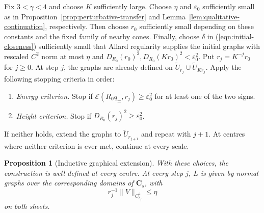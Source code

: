 \documentclass[11pt,a4paper]{article}
\numberwithin{equation}{section}
\newtheorem{proposition}[theorem]{Proposition}
\theoremstyle{definition}
\theoremstyle{remark}
\begin{document}
	Fix $3<\gamma<4$ and choose $K$ sufficiently large.
	Choose $\eta$ and $\varepsilon_0$ sufficiently small as in
	Proposition~\ref{prop:perturbative-transfer} and
	Lemma~\ref{lem:qualitative-continuation}, respectively.
	Then choose $r_0$ sufficiently small depending on these constants
	and the fixed family of nearby cones.
	Finally, choose $\delta$ in (\ref{eqn:initial-closeness}) sufficiently
	small that Allard regularity supplies the initial graphs with
	rescaled $C^2$ norm at most $\eta$ and
	$D_{R_0}(r_0)^2,D_{R_0}(Kr_0)^2<\varepsilon_0^2$.
	Put $r_j=K^{-j}r_0$ for $j\ge0$. At step $j$, the graphs are already defined
	on $\widetilde U_{r_j}\cup\widetilde U_{Kr_j}$. Apply the following
	stopping criteria in order:
	\begin{enumerate}
		\item \emph{Energy criterion.} Stop if
		$\mathcal E(R_0q_\pm,r_j)\ge\varepsilon_0^2$ for at least one of the two signs.
		\item \emph{Height criterion.} Stop if $D_{R_0}(r_j)^2\ge\varepsilon_0^2$.
	\end{enumerate}
	If neither holds, extend the graphs to $\widetilde U_{r_{j+1}}$
	and repeat with $j+1$.
	At centres where neither criterion is ever met, continue at every scale.
	
	\begin{proposition}[Inductive graphical extension]\label{prop:inductive-extension}
		With these choices, the construction is
		well defined at every centre.
		At every step $j$, $L$ is given by normal
		graphs over the corresponding domains of $\mathbf C_s$, with
		\[
		r_j^{-1}\|V\|_{C^2_{r_j}}\le\eta
		\]
		on both sheets.
	\end{proposition}
	
\end{document}

